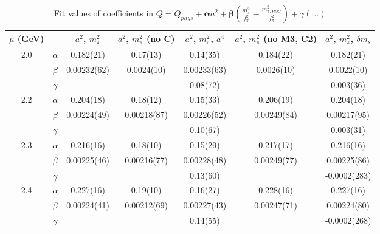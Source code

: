\documentclass[12pt]{extarticle}
\begin{document}
\begin{table}[h!]
\begin{center}
\begin{tabular}{|c c|c|c|c|c|c|}
\hline
$\mu$ (GeV) &  & $a^2$, $m_\pi^2$& $a^2$, $m_\pi^2$ (no C)& $a^2$, $m_\pi^2$, $a^4$& $a^2$, $m_\pi^2$ (no M3, C2)& $a^2$, $m_\pi^2$, $\delta m_s$\\
\hline
\multirow{3}{0.5in}{2.0} & $\alpha$ & 0.182(21)& 0.17(13)& 0.14(35)& 0.184(22)& 0.182(21)\\
 & $\beta$ & 0.00232(62)& 0.0024(10)& 0.00233(63)& 0.0026(10)& 0.0022(10)\\
 & $\gamma$ &  &  & 0.08(72)&  & 0.003(36)\\
\hline
\multirow{3}{0.5in}{2.2} & $\alpha$ & 0.204(18)& 0.18(12)& 0.15(33)& 0.206(19)& 0.204(18)\\
 & $\beta$ & 0.00224(49)& 0.00218(87)& 0.00226(52)& 0.00249(84)& 0.00217(95)\\
 & $\gamma$ &  &  & 0.10(67)&  & 0.003(31)\\
\hline
\multirow{3}{0.5in}{2.3} & $\alpha$ & 0.216(16)& 0.18(10)& 0.15(29)& 0.217(17)& 0.216(16)\\
 & $\beta$ & 0.00225(46)& 0.00216(77)& 0.00228(48)& 0.00249(77)& 0.00225(86)\\
 & $\gamma$ &  &  & 0.13(60)&  & -0.0002(283)\\
\hline
\multirow{3}{0.5in}{2.4} & $\alpha$ & 0.227(16)& 0.19(10)& 0.16(27)& 0.228(16)& 0.227(16)\\
 & $\beta$ & 0.00224(41)& 0.00212(69)& 0.00227(43)& 0.00247(71)& 0.00224(80)\\
 & $\gamma$ &  &  & 0.14(55)&  & -0.0002(268)\\
\hline
\end{tabular}
\caption{Fit values of coefficients in $Q = Q_{phys} + \mathbf{\alpha} a^2 + \mathbf{\beta}\left(\frac{m_\pi^2}{f_\pi^2}-\frac{m_{\pi,PDG}^2}{f_\pi^2}\right) + \gamma(\ldots)$}
\end{center}
\end{table}




















\clearpage
\end{document}

